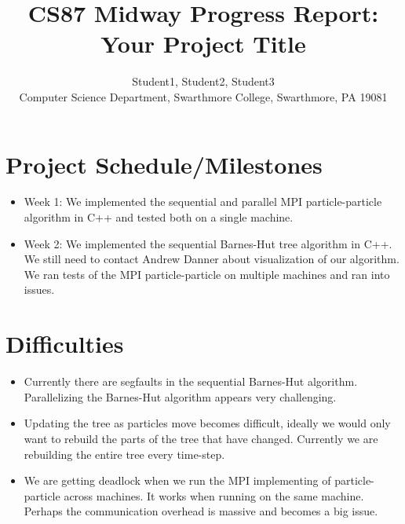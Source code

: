 \documentclass[11pt]{article}
\begin{document}
\title{CS87 Midway Progress Report: Your Project Title}

\author{Student1, Student2, Student3 \\
Computer Science Department, Swarthmore College, Swarthmore, PA  19081}

\maketitle

\section{Project Schedule/Milestones}


\begin{itemize}
\item Week 1: We implemented the sequential and parallel MPI particle-particle algorithm in C++ and tested both on a single machine. 
\item Week 2: We implemented the sequential Barnes-Hut tree algorithm in C++. We still need to contact Andrew Danner about visualization of our algorithm. We ran tests of the MPI particle-particle on multiple machines and ran into issues.
\end{itemize}

\section {Difficulties}

\begin{itemize}
    \item Currently there are segfaults in the sequential Barnes-Hut algorithm. Parallelizing the Barnes-Hut algorithm appears very challenging. 
    \item Updating the tree as particles move becomes difficult, ideally we would only want to rebuild the parts of the tree that have changed. Currently we are rebuilding the entire tree every time-step.
    \item We are getting deadlock when we run the MPI implementing of particle-particle across machines. It works when running on the same machine. Perhaps the communication overhead is massive and becomes a big issue. 
\end{itemize}
\end{document}
